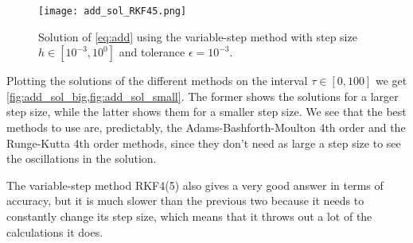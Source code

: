 \documentclass[10pt,a4paper,twocolumn]{article}
\begin{document}
\begin{figure}
    \centering
    \captionsetup{justification=centering}
    \texttt{[image: add\_sol\_RKF45.png]}
    \caption{Solution  of \cref{eq:add} using the variable-step method with step size $h \in [10^{-3}, 10^{0}]$ and tolerance $\epsilon = 10^{-3}$.}
    \label{fig:add_sol_small}
\end{figure}

Plotting the solutions of the different methods on the interval $\tau \in [0,100]$ we get \cref{fig:add_sol_big,fig:add_sol_small}. The former shows the solutions for a larger step size, while the latter shows them for a smaller step size. We see that the best methods to use are, predictably, the Adams-Bashforth-Moulton 4th order and the Runge-Kutta 4th order methods, since they don't need as large a step size to see the oscillations in the solution.

The variable-step method RKF4(5) also gives a very good answer in terms of accuracy, but it is much slower than the previous two because it needs to constantly change its step size, which means that it throws out a lot of the calculations it does.

\printbibliography
\end{document}
